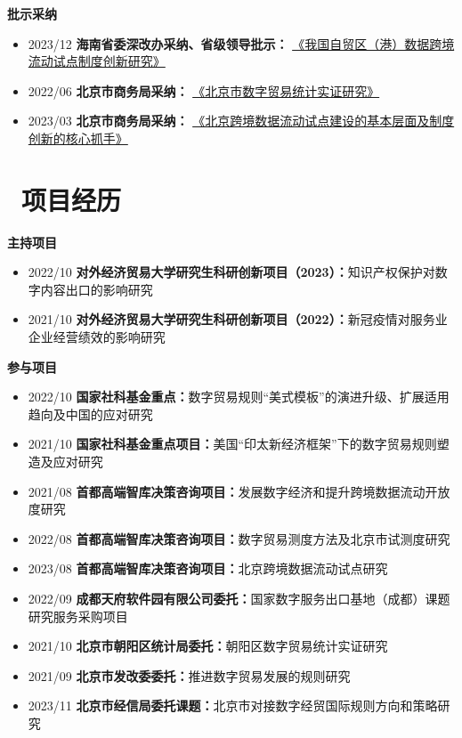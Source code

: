 \documentclass[11pt]{article}
\begin{document}
	\textbf{批示采纳}
	\begin{itemize}
		\item 2023/12 \quad
		\textbf{海南省委深改办采纳、省级领导批示：}
		\href{}{《我国自贸区（港）数据跨境流动试点制度创新研究》} 
		
		\item 2022/06 \quad
		\textbf{北京市商务局采纳：}
		\href{}{《北京市数字贸易统计实证研究》} 
		
		\item 2023/03 \quad
		\textbf{北京市商务局采纳：}
		\href{}{《北京跨境数据流动试点建设的基本层面及制度创新的核心抓手》} 
		
	\end{itemize}
	
	
	
	\section{\makebox[\widthof{\faGraduationCap}][c]{\color{CVBlue}\faGears}\ 项目经历}
	
	\textbf{主持项目}
	\begin{itemize} %
		\item 2022/10 \quad \textbf{对外经济贸易大学研究生科研创新项目（2023）：}知识产权保护对数字内容出口的影响研究
		\item 2021/10 \quad \textbf{对外经济贸易大学研究生科研创新项目（2022）：}新冠疫情对服务业企业经营绩效的影响研究
	\end{itemize}

	\textbf{参与项目}
	\begin{itemize} %
		\item 2022/10 \quad \textbf{国家社科基金重点：}数字贸易规则“美式模板”的演进升级、扩展适用趋向及中国的应对研究 
		\item 2021/10 \quad \textbf{国家社科基金重点项目：}美国“印太新经济框架”下的数字贸易规则塑造及应对研究
		\item 2021/08 \quad \textbf{首都高端智库决策咨询项目：}发展数字经济和提升跨境数据流动开放度研究
		\item 2022/08 \quad \textbf{首都高端智库决策咨询项目：}数字贸易测度方法及北京市试测度研究 
		\item 2023/08 \quad \textbf{首都高端智库决策咨询项目：}北京跨境数据流动试点研究
		\item 2022/09 \quad \textbf{成都天府软件园有限公司委托：}国家数字服务出口基地（成都）课题研究服务采购项目 
		\item 2021/10 \quad \textbf{北京市朝阳区统计局委托：}朝阳区数字贸易统计实证研究 
		\item 2021/09 \quad \textbf{北京市发改委委托：}推进数字贸易发展的规则研究
		\item 2023/11 \quad \textbf{北京市经信局委托课题：}北京市对接数字经贸国际规则方向和策略研究
	\end{itemize}
	
\end{document}
